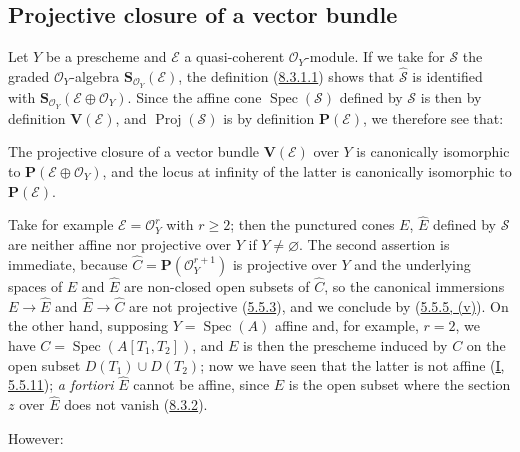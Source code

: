 \subsection{Projective closure of a vector bundle}
\label{subsection:II.8.4}

\begin{env}[8.4.1]
\label{II.8.4.1}
Let $Y$ be a prescheme and $\mathcal{E}$ a quasi-coherent $\mathcal{O}_Y$-module.
If we take for $\mathcal{S}$ the graded $\mathcal{O}_Y$-algebra
$\mathbf{S}_{\mathcal{O}_Y}(\mathcal{E})$, the definition
(\hyperref[II.8.3.1.1]{8.3.1.1}) shows that
$\widehat{\mathcal{S}}$ is identified with
$\mathbf{S}_{\mathcal{O}_Y}(\mathcal{E}\oplus\mathcal{O}_Y)$. Since the affine cone
$\operatorname{Spec}(\mathcal{S})$ defined by $\mathcal{S}$ is then by
definition $\mathbf{V}(\mathcal{E})$, and $\operatorname{Proj}(\mathcal{S})$
is by definition $\mathbf{P}(\mathcal{E})$, we therefore see that:
\end{env}

\begin{proposition}[8.4.2]
\label{II.8.4.2}
The projective closure of a vector bundle $\mathbf{V}(\mathcal{E})$ over
$Y$ is canonically isomorphic to
$\mathbf{P}(\mathcal{E}\oplus\mathcal{O}_Y)$, and the locus at infinity of the
latter is canonically isomorphic to $\mathbf{P}(\mathcal{E})$.
\end{proposition}

\begin{remark}[8.4.3]
\label{II.8.4.3}
Take for example $\mathcal{E}=\mathcal{O}_Y^r$ with $r\geq2$; then the
punctured cones $E$, $\widehat{E}$ defined by $\mathcal{S}$ are neither affine
nor projective over $Y$ if $Y\neq\varnothing$. The second assertion is
immediate, because $\widehat{C}=\mathbf{P}(\mathcal{O}_Y^{r+1})$ is projective over
$Y$ and the underlying spaces of $E$ and $\widehat{E}$ are non-closed open
subsets of $\widehat{C}$, so the canonical immersions
$E\to\widehat{E}$ and $\widehat{E}\to\widehat{C}$ are not projective
(\hyperref[II.5.5.3]{5.5.3}), and we conclude by
(\hyperref[II.5.5.5]{5.5.5, (v)}). On the other hand, supposing
$Y=\operatorname{Spec}(A)$ affine and, for example, $r=2$, we have
$C=\operatorname{Spec}(A[T_1,T_2])$, and $E$ is then the prescheme induced by
$C$ on the open subset $D(T_1)\cup D(T_2)$; now we have seen that the latter is
not affine (\hyperref[I.5.5.11]{I, 5.5.11});
\emph{a fortiori} $\widehat{E}$ cannot be affine, since $E$ is the open subset
where the section $z$ over $\widehat{E}$ does not vanish
(\hyperref[II.8.3.2]{8.3.2}).

However:
\end{remark}

